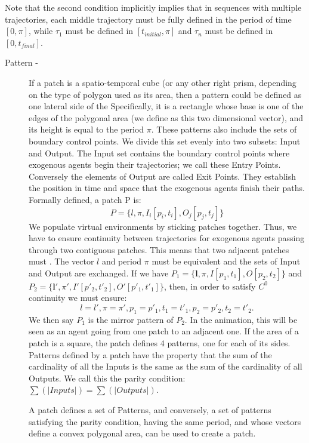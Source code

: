 Note that the second condition implicitly implies that in sequences with multiple trajectories, each middle trajectory must be fully defined in the period of time $[0,\pi]$, while $\tau_1$ must be defined in $[t_{initial},\pi]$ and $\tau_n$ must be defined in $[0, t_{final}]$.

\begin{description}

\item[Pattern -]{If a patch is a spatio-temporal cube (or any other right prism, depending on the type of polygon used as its area, then a pattern could be defined as one lateral side of the  Specifically, it is a rectangle whose base is one of the edges of the polygonal area (we define  as this two dimensional vector), and its height is equal to the period $\pi$. These patterns also include the sets of boundary control points. We divide this set evenly into two subsets: Input and Output. The Input set contains the boundary control points where exogenous agents begin their trajectories; we call these Entry Points. Conversely the elements of Output are called Exit Points. They establish the position in time and space that the exogenous agents finish their paths. Formally defined, a patch P is:
$$ P = \{l, \pi, I_i [p_i, t_i], O_j[p_j, t_j]\}$$
We populate virtual environments by sticking patches together. Thus, we have to ensure continuity between trajectories for exogenous agents passing through two contiguous patches. This means that two adjacent patches must . The vector $l$ and period $\pi$ must be equivalent and the sets of Input and Output are exchanged. If we have $P_1=\{\mathbf{l}, \pi, I [p_1,t_1], O[p_2,t_2]\}$ and $P_2=\{\mathbf{l'}, \pi', I'[p'_2, t'_2], O'[p'_1, t'_1]\}$, then, in order to satisfy $C^0$ continuity we must ensure: 
$$ l=l', \pi=\pi', p_1=p'_1, t_1=t'_1, p_2=p'_2, t_2=t'_2.$$
We then say $P_1$ is the mirror pattern of $P_2$. In the animation, this will be seen as an agent going from one patch to an adjacent one. 
If the area of a patch is a square, the patch defines 4 patterns, one for each of its sides. Patterns defined by a patch have the property that the sum of the cardinality of all the Inputs is the same as the sum of the cardinality of all Outputs. We call this the parity condition: $\sum(|Inputs|)= \sum(|Outputs|)$.

A patch defines a set of Patterns, and conversely, a set of patterns satisfying the parity condition, having the same period, and whose vectors define a convex polygonal area, can be used to create a patch. 
 }

\end{description}


